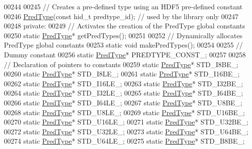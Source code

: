 \begin{DoxyCode}
00244 
00245         \textcolor{comment}{// Creates a pre-defined type using an HDF5 pre-defined constant}
00246         \hyperlink{class_h5_1_1_pred_type}{PredType}(\textcolor{keyword}{const} hid\_t predtype\_id);  \textcolor{comment}{// used by the library only}
00247 
00248    \textcolor{keyword}{private}:
00249         \textcolor{comment}{// Activates the creation of the PredType global constants}
00250         \textcolor{keyword}{static} \hyperlink{class_h5_1_1_pred_type}{PredType}* getPredTypes();
00251 
00252         \textcolor{comment}{// Dynamically allocates PredType global constants}
00253         \textcolor{keyword}{static} \textcolor{keywordtype}{void} makePredTypes();
00254 
00255         \textcolor{comment}{// Dummy constant}
00256         \textcolor{keyword}{static} \hyperlink{class_h5_1_1_pred_type}{PredType}* PREDTYPE\_CONST\_;
00257 
00258         \textcolor{comment}{// Declaration of pointers to constants}
00259         \textcolor{keyword}{static} \hyperlink{class_h5_1_1_pred_type}{PredType}* STD\_I8BE\_;
00260         \textcolor{keyword}{static} \hyperlink{class_h5_1_1_pred_type}{PredType}* STD\_I8LE\_;
00261         \textcolor{keyword}{static} \hyperlink{class_h5_1_1_pred_type}{PredType}* STD\_I16BE\_;
00262         \textcolor{keyword}{static} \hyperlink{class_h5_1_1_pred_type}{PredType}* STD\_I16LE\_;
00263         \textcolor{keyword}{static} \hyperlink{class_h5_1_1_pred_type}{PredType}* STD\_I32BE\_;
00264         \textcolor{keyword}{static} \hyperlink{class_h5_1_1_pred_type}{PredType}* STD\_I32LE\_;
00265         \textcolor{keyword}{static} \hyperlink{class_h5_1_1_pred_type}{PredType}* STD\_I64BE\_;
00266         \textcolor{keyword}{static} \hyperlink{class_h5_1_1_pred_type}{PredType}* STD\_I64LE\_;
00267         \textcolor{keyword}{static} \hyperlink{class_h5_1_1_pred_type}{PredType}* STD\_U8BE\_;
00268         \textcolor{keyword}{static} \hyperlink{class_h5_1_1_pred_type}{PredType}* STD\_U8LE\_;
00269         \textcolor{keyword}{static} \hyperlink{class_h5_1_1_pred_type}{PredType}* STD\_U16BE\_;
00270         \textcolor{keyword}{static} \hyperlink{class_h5_1_1_pred_type}{PredType}* STD\_U16LE\_;
00271         \textcolor{keyword}{static} \hyperlink{class_h5_1_1_pred_type}{PredType}* STD\_U32BE\_;
00272         \textcolor{keyword}{static} \hyperlink{class_h5_1_1_pred_type}{PredType}* STD\_U32LE\_;
00273         \textcolor{keyword}{static} \hyperlink{class_h5_1_1_pred_type}{PredType}* STD\_U64BE\_;
00274         \textcolor{keyword}{static} \hyperlink{class_h5_1_1_pred_type}{PredType}* STD\_U64LE\_;
00275         \textcolor{keyword}{static} \hyperlink{class_h5_1_1_pred_type}{PredType}* STD\_B8BE\_;

\end{DoxyCode}
